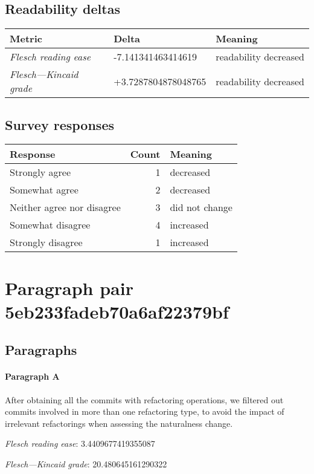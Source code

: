 \subsection{Readability deltas}

\begin{tabular}{lll}
\toprule
               \textbf{Metric} &       \textbf{Delta} &       \textbf{Meaning} \\
\midrule
    \emph{Flesch reading ease} &   -7.141341463414619 &  readability decreased \\
 \emph{Flesch---Kincaid grade} &  +3.7287804878048765 &  readability decreased \\
\bottomrule
\end{tabular}

\subsection{Survey responses}
\begin{tabular}{lrl}
\toprule
          \textbf{Response} &  \textbf{Count} & \textbf{Meaning} \\
\midrule
             Strongly agree &               1 &        decreased \\
             Somewhat agree &               2 &        decreased \\
 Neither agree nor disagree &               3 &   did not change \\
          Somewhat disagree &               4 &        increased \\
          Strongly disagree &               1 &        increased \\
\bottomrule
\end{tabular}

\section{Paragraph pair 5eb233fadeb70a6af22379bf}
\subsection{Paragraphs}
\paragraph{Paragraph A}
After obtaining all the commits with refactoring operations, we filtered out commits involved in more than one refactoring type, to avoid the impact of irrelevant refactorings when assessing the naturalness change.\par\medskip\emph{Flesch reading ease}: 3.4409677419355087\par\emph{Flesch---Kincaid grade}: 20.480645161290322

